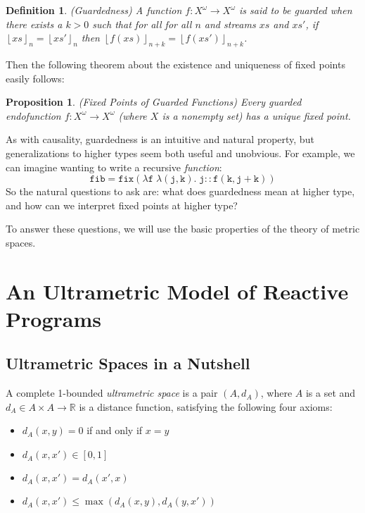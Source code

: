 \documentclass[preprint]{sigplanconf}
\newcommand{\R}{\mathbb{R}}
\newcommand{\term}[1]{\ensuremath{\mathtt{{#1}}}}
\newcommand{\floor}[1]{\left\lfloor{#1}\right\rfloor}
\newtheorem{prop}{Proposition}
\newtheorem{definition}{Definition}
\begin{document}
\begin{definition}{(Guardedness)}
A function $f : X^\omega \to X^\omega$ is said to be \emph{guarded}
when there exists a $k > 0$ such that for all for all $n$ and streams
$xs$ and $xs'$, if $\floor{xs}_n = \floor{xs'}_n$ then
$\floor{f(xs)}_{n+k} = \floor{f(xs')}_{n+k}$.
\end{definition}

Then the following theorem about the existence and uniqueness of fixed
points easily follows: 

\begin{prop}{(Fixed Points of Guarded Functions)}
Every guarded endofunction $f : X^\omega \to X^\omega$ (where $X$ is a
nonempty set) has a unique fixed point.
\end{prop}

As with causality, guardedness is an intuitive and natural property,
but generalizations to higher types seem both useful and unobvious. For
example, we can imagine wanting to write a recursive \emph{function}:
\begin{displaymath}
\term{fib = fix(\lambda f\; \lambda (j,k).\; j :: f(k,j+k))}
\end{displaymath}
So the natural questions to ask are: what does guardedness mean at
higher type, and how can we interpret fixed points at higher type?

To answer these questions, we will use the basic properties of the
theory of metric spaces.

\section{An Ultrametric Model of Reactive Programs}

\subsection{Ultrametric Spaces in a Nutshell}

A complete 1-bounded \emph{ultrametric space} is a pair $(A, d_A)$,
where $A$ is a set and $d_A \in A \times A \to \R$ is a distance
function, satisfying the following four axioms:

\begin{itemize}
\item $d_A(x, y) = 0$ if and only if $x = y$
\item $d_A(x, x') \in [0,1]$
\item $d_A(x, x') = d_A(x', x)$
\item $d_A(x, x') \leq \max(d_A(x, y), d_A(y, x'))$
\end{itemize}
\end{document}
